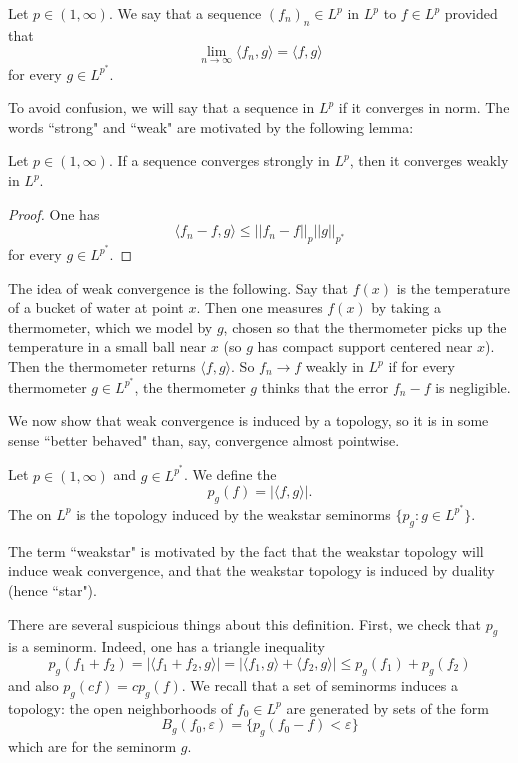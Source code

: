 \begin{definition}
Let $p \in (1, \infty)$. We say that a sequence $(f_n)_n \in L^p$  in $L^p$ to $f \in L^p$ provided that
$$\lim_{n \to \infty} \langle f_n, g\rangle = \langle f, g\rangle$$
for every $g \in L^{p^*}$.
\end{definition}

To avoid confusion, we will say that a sequence  in $L^p$ if it converges in norm.
The words ``strong" and ``weak" are motivated by the following lemma:

\begin{lemma}
Let $p \in (1, \infty)$. If a sequence converges strongly in $L^p$, then it converges weakly in $L^p$.
\end{lemma}
\begin{proof}
One has
$$\langle f_n - f, g \rangle \leq ||f_n - f||_p ||g||_{p^*}$$
for every $g \in L^{p^*}$.
\end{proof}

The idea of weak convergence is the following. Say that $f(x)$ is the temperature of a bucket of water at point $x$.
Then one measures $f(x)$ by taking a thermometer, which we model by $g$, chosen so that the thermometer picks up the temperature in a small ball near $x$ (so $g$ has compact support centered near $x$).
Then the thermometer returns $\langle f, g\rangle$.
So $f_n \to f$ weakly in $L^p$ if for every thermometer $g \in L^{p^*}$, the thermometer $g$ thinks that the error $f_n - f$ is negligible.

We now show that weak convergence is induced by a topology, so it is in some sense ``better behaved" than, say, convergence almost pointwise.

\begin{definition}
Let $p \in (1, \infty)$ and $g \in L^{p^*}$.
We define the 
$$p_g(f) = |\langle f, g\rangle|.$$
The  on $L^p$ is the topology induced by the weakstar seminorms $\{p_g: g \in L^{p^*}\}$.
\end{definition}

The term ``weakstar" is motivated by the fact that the weakstar topology will induce weak convergence, and that the weakstar topology is induced by duality (hence ``star").

There are several suspicious things about this definition. First, we check that $p_g$ is a seminorm. Indeed, one has a triangle inequality
$$p_g(f_1 + f_2) = |\langle f_1 + f_2, g\rangle| = |\langle f_1, g\rangle + \langle f_2, g\rangle| \leq p_g(f_1) + p_g(f_2)$$
and also $p_g(cf) = cp_g(f)$.
We recall that a set of seminorms induces a topology: the open neighborhoods of $f_0 \in L^p$ are generated by sets of the form
$$B_g(f_0, \varepsilon) = \{p_g(f_0 - f) < \varepsilon\}$$
which are  for the seminorm $g$.

